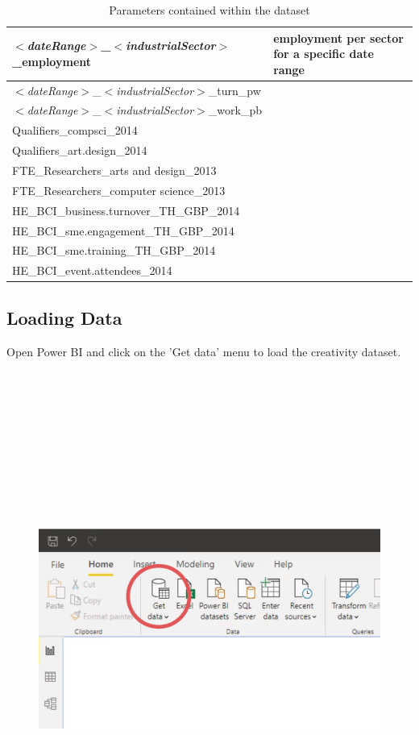 \documentclass[11pt]{article}
\begin{document}
\begin{table}[h!]
\begin{tabular}{|l|m{8cm}|}
        \hline
        $<$\textit{dateRange}$>$\_$<$\textit{industrialSector}$>$\_employment & employment per sector for a specific date range \\
        \hline
        $<$\textit{dateRange}$>$\_$<$\textit{industrialSector}$>$\_turn\_pw &  \\
        \hline
        $<$\textit{dateRange}$>$\_$<$\textit{industrialSector}$>$\_work\_pb &  \\
        \hline
        Qualifiers\_compsci\_2014 &  \\
        \hline
        Qualifiers\_art.design\_2014 &  \\
        \hline
        FTE\_Researchers\_arts and design\_2013 &  \\
        \hline
        FTE\_Researchers\_computer science\_2013 &  \\
        \hline
        HE\_BCI\_business.turnover\_TH\_GBP\_2014 &  \\
        \hline
        HE\_BCI\_sme.engagement\_TH\_GBP\_2014 &  \\
        \hline
        HE\_BCI\_sme.training\_TH\_GBP\_2014 &  \\
        \hline
        HE\_BCI\_event.attendees\_2014 &  \\
        \hline
    \end{tabular}
    \caption{Parameters contained within the dataset}
    \label{tab:my_label}
\end{table}

\subsection{Loading Data}

Open Power BI and click on the 'Get data' menu to load the creativity dataset.\\
\\
\\
\\
\\
\\
\\
\\
\\
\\
\\

\begin{figure}[h!]
    \centering
    \includegraphics[width=.6\linewidth]{img/getData.png}
\end{figure}
\end{document}
